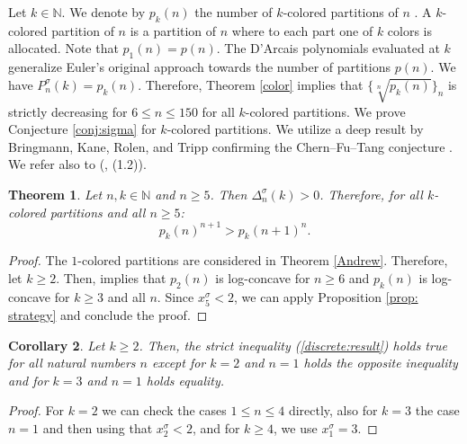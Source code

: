 \documentclass[11pt,reqno]{amsart}
\theoremstyle{plain}
\newtheorem{theorem}{Theorem}[section]
\newtheorem{corollary}[theorem]{Corollary}
\theoremstyle{remark}
\theoremstyle{definition}
\numberwithin{equation}{section}
\begin{document}
Let $k \in \mathbb{N}$. We denote by
$p_k(n)$ the number of $k$-colored partitions of $n$ \cite{CFT18, BKRT21, BKPR25}. A $k$-colored partition of
$n$ is a partition of $n$ where to
each part one of $k$ colors is allocated.
Note that $p_1(n)=p(n)$. The D'Arcais polynomials evaluated at $k$ generalize
Euler's original approach towards the number of partitions $p(n)$.
We have $P_n^{\sigma}(k)=p_k(n)$. Therefore, Theorem \ref{color} implies that
$\{\sqrt[n]{p_k(n)}\}_{n}$ is strictly decreasing for $6 \leq n \leq 150$ for all $k$-colored partitions. We prove
Conjecture \ref{conj:sigma} for $k$-colored partitions. We utilize a deep
result by
Bringmann, Kane, Rolen,
and Tripp \cite{BKRT21} confirming the
Chern--Fu--Tang conjecture \cite{CFT18}. We refer also to (\cite{HN21},
(1.2)).
\begin{theorem} 
\label{th:color}Let $n,k \in \mathbb{N}$ and $n \geq 5
$.
Then $\Delta_n^{\sigma}(k) >0$. Therefore, for all
$k$-colored partitions and all $n \geq 5
$:
\begin{equation} \label{discrete:result}
p_k(n)^{n+1} > p_{k}(n+1)^n.
\end{equation}
\end{theorem}
\begin{proof}
The $1$-colored
partitions are considered in Theorem \ref{Andrew}. 
Therefore, let $k \geq 2$. Then, \cite{BKRT21}
implies that
$p_2(n)$ is log-concave for $n \geq 6$ and 
$p_k(n)$ is log-concave for $k\geq 3$ and all $n$. 
Since $x_{5
}^{\sigma}<2
$, we can apply Proposition
\ref{prop: strategy} and conclude
the proof.
\end{proof}
\begin{corollary}
Let $k \geq 2$. Then, the strict inequality (\ref{discrete:result})
holds true for all natural numbers $n$
except for $k=2$ and $n=1$ holds the opposite inequality
and for $k=3$ and $n=1$ holds equality.
\end{corollary}

\begin{proof}
For $k=2
$ we can check the cases $1\leq n
\leq 4
$
directly, also for $k=3$ the case $n=1$ and then using
that $x_{2}^{\sigma }<2$,
and for $k\geq 4$, we use $x_{1}^{\sigma }=3
$.
\end{proof}
\end{document}
